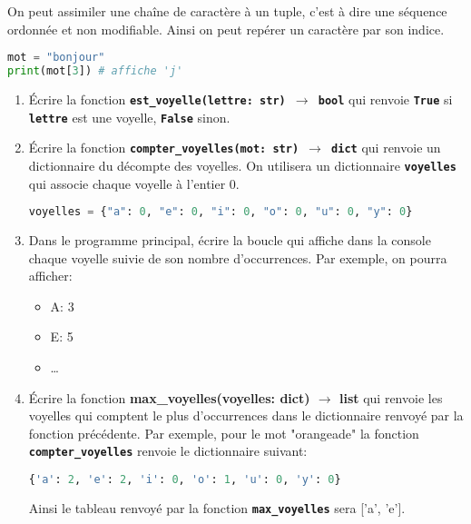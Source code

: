 \documentclass[a4paper,11pt]{article}
\begin{document}
\begin{exo}
    On peut assimiler une chaîne de caractère à un tuple, c'est à dire une séquence ordonnée et non modifiable. Ainsi on peut repérer un caractère par son indice.
    \begin{lstlisting}[language=Python  , xleftmargin=2em, xrightmargin=2em]
mot = "bonjour"
print(mot[3]) # affiche 'j'
\end{lstlisting}
    \begin{enumerate}
        \item Écrire la fonction \textbf{\texttt{est\_voyelle(lettre: str) $\rightarrow$ bool}} qui renvoie \textbf{\texttt{True}} si \textbf{\texttt{lettre}} est une voyelle, \textbf{\texttt{False}} sinon.
        \item Écrire la fonction \texttt{\textbf{compter\_voyelles(mot: str) $\rightarrow$ dict}} qui renvoie un dictionnaire du décompte des voyelles. On utilisera un dictionnaire \texttt{\textbf{voyelles}} qui associe chaque voyelle à l'entier 0.
\begin{lstlisting}[language=Python  , xleftmargin=2em, xrightmargin=2em]
voyelles = {"a": 0, "e": 0, "i": 0, "o": 0, "u": 0, "y": 0}
\end{lstlisting}
        \item Dans le programme principal, écrire la boucle qui affiche dans la console chaque voyelle suivie de son nombre d'occurrences. Par exemple, on pourra afficher:
              \begin{itemize}
                  \item A: 3
                  \item E: 5
                  \item \dots
              \end{itemize}
        \item Écrire la fonction \textbf{max\_voyelles(voyelles: dict) $\rightarrow$ list} qui renvoie les voyelles qui comptent le plus d'occurrences dans le dictionnaire renvoyé par la fonction précédente. Par exemple, pour le mot "orangeade" la fonction \textbf{\texttt{compter\_voyelles}} renvoie le dictionnaire suivant:
\begin{lstlisting}[language=Python  , xleftmargin=2em, xrightmargin=2em]
{'a': 2, 'e': 2, 'i': 0, 'o': 1, 'u': 0, 'y': 0}
\end{lstlisting}
        Ainsi le tableau renvoyé par la fonction \textbf{\texttt{max\_voyelles}} sera ['a', 'e'].
    \end{enumerate}
\end{exo}
\end{document}
